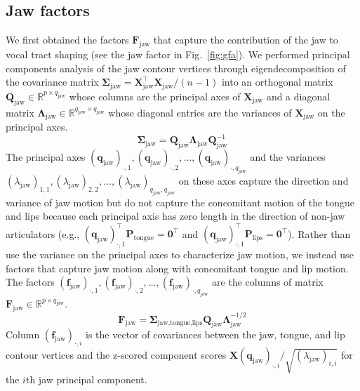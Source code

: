 \documentclass[preprint]{JASAnew}\usepackage[]{graphicx}\usepackage[]{color}
\begin{document}
\subsection{Jaw factors}
\label{subsec:jawfactors}

We first obtained the factors $\mathbf{F}_\text{jaw}$ that capture the contribution of the jaw to vocal tract shaping (see the jaw factor in Fig.~\ref{fig:gfa}). 
% 
We performed principal components analysis of the jaw contour vertices through eigendecomposition of the covariance matrix $\boldsymbol{\Sigma}_\text{jaw} = \mathbf{X}_\text{jaw}^\intercal \mathbf{X}_\text{jaw}/(n-1)$ into an orthogonal matrix $\mathbf{Q}_\text{jaw} \in \mathbb{R}^{p\times q_\text{jaw}}$ whose columns are the principal axes of $\mathbf{X}_\text{jaw}$ and a diagonal matrix $\boldsymbol{\Lambda}_\text{jaw} \in \mathbb{R}^{q_\text{jaw} \times q_\text{jaw}}$ whose diagonal entries are the variances of $\mathbf{X}_\text{jaw}$ on the principal axes.
% 
\begin{equation}
\boldsymbol{\Sigma}_\text{jaw} = \mathbf{Q}_\text{jaw}\boldsymbol{\Lambda}_\text{jaw} \mathbf{Q}_\text{jaw}^{-1}
\end{equation}
%
The principal axes $(\mathbf{q}_\text{jaw})_{\cdot,1}, (\mathbf{q}_\text{jaw})_{\cdot,2}, \ldots, (\mathbf{q}_\text{jaw})_{\cdot,q_\text{jaw}}$ and the variances $(\lambda_\text{jaw})_{1,1}, (\lambda_\text{jaw})_{2,2}, \ldots, (\lambda_\text{jaw})_{q_\text{jaw},q_\text{jaw}}$ on these axes capture the direction and variance of jaw motion but do not capture the concomitant motion of the tongue and lips 
% 
because each principal axis has zero length in the direction of non-jaw articulators 
% 
(e.g., $(\mathbf{q}_\text{jaw})_{\cdot,1}^\intercal \mathbf{P}_\text{tongue} = \mathbf{0}^\intercal$ and $(\mathbf{q}_\text{jaw})_{\cdot,1}^\intercal \mathbf{P}_\text{lips} = \mathbf{0}^\intercal$). 
% 
Rather than use the variance on the principal axes to characterize jaw motion, we instead use factors that capture jaw motion along with concomitant tongue and lip motion. 
% 
The factors $(\mathbf{f}_\text{jaw})_{\cdot,1},(\mathbf{f}_\text{jaw})_{\cdot,2},\ldots,(\mathbf{f}_\text{jaw})_{\cdot,q_\text{jaw}}$ are the columns of matrix $\mathbf{F}_\text{jaw} \in \mathbb{R}^{p\times q_\text{jaw}}$. 
%
\begin{equation}
\mathbf{F}_\text{jaw}
 = \boldsymbol{\Sigma}_\text{jaw,tongue,lips} \mathbf{Q}_\text{jaw} \boldsymbol{\Lambda}_\text{jaw}^{-1/2}
\end{equation}
%
Column $(\mathbf{f}_\text{jaw})_{\cdot,i}$ is the vector of covariances between the jaw, tongue, and lip contour vertices and the z-scored component scores $\mathbf{X} (\mathbf{q}_\text{jaw})_{\cdot,i} / \sqrt{(\lambda_\text{jaw})_{i,i}}$ for the $i$th jaw principal component. 
\end{document}
